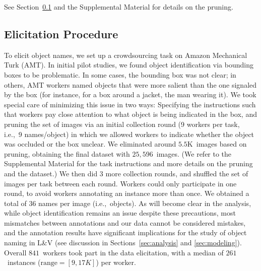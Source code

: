 See Section\ \ref{ssec:elicitation} and the Supplemental Material for details on the pruning. 

\subsection{Elicitation Procedure}
\label{ssec:elicitation}
To elicit object names, we set up a crowdsourcing task on Amazon Mechanical Turk (AMT).
In initial pilot studies, we found object identification via bounding boxes to be problematic.
In some cases, the bounding box was not clear; in others, AMT workers named objects that were more salient than the one signaled by the box (for instance, for a box around a jacket, the man wearing it).
We took special care of minimizing this issue in two ways: Specifying the instructions such that workers pay close attention to what object is being indicated in the box, and pruning the set of images via an initial collection round (9 workers per task, i.e.,\ 9 names/object) in which we allowed workers to indicate whether the object was occluded or the box unclear. 
We eliminated around $5.5$K\ images based on pruning, obtaining the final dataset with $25,596$\ images. 
(We refer to the Supplemental Material for the task instructions and more details on the pruning and the dataset.) 
We then did 3 more collection rounds, and shuffled the set of images per task between each round. 
Workers could only participate in one round, to avoid workers annotating an instance more than once. 
We obtained a total of 36 names per image (i.e.,\ objects).
As will become clear in the analysis, while object identification remains an issue despite these precautions, most mismatches between \vg annotations  and our data cannot be considered mistakes, and the annotation results have significant implications for the study of object naming in L\&V (see discussion in Sections~\ref{sec:analysis} and \ref{sec:modeling}).
Overall $841$\ workers took part in the data elicitation, with a median of  $261$\ instances \mbox{($\textrm{range}=[9,17K]$)} per worker.

